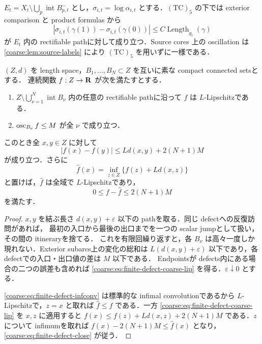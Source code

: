 \documentclass[a4paper,11pt]{ltjsarticle}
\numberwithin{equation}{section}
\theoremstyle{plain}
\theoremstyle{definition}
\theoremstyle{remark}
\newcommand{\Length}{\operatorname{Length}}\newcommand{\Lip}{\operatorname{Lip}}\newcommand{\GH}{\mathrm{GH}}\newcommand{\id}{\mathrm{id}}
\begin{document}
$E_t=X_t\setminus\bigcup_p\operatorname{int}B_{p,t}^-$ とし，$\sigma_{i,t}=\log\alpha_{i,t}$ とする．$\mathrm{(TC)}_5$ の下では exterior comparison と product formulas から
\begin{equation}\label{coarse:eq:exterior-depth-lip}
 |\sigma_{i,t}(\gamma(1))-\sigma_{i,t}(\gamma(0))|
 \le C\Length_{g_t}(\gamma)
\end{equation}
が $E_t$ 内の rectifiable pathに対して成り立つ．Source cores 上の oscillation は \cref{coarse:lem:source-labels} により $\mathrm{(TC)}_5$ を用いずに一様である．

\begin{lemma}\label{coarse:lem:finite-defect-extension}
$(Z,d)$ を length space，$B_1,\ldots,B_N\subset Z$ を互いに素な compact connected setsとする．
連続関数 $f:Z\to\mathbf R$ が次を満たすとする．
\begin{enumerate}[label=\textup{(D\arabic*)}]
\item $Z\setminus\bigcup_{\nu=1}^N\operatorname{int}B_\nu$ 内の任意の rectifiable pathに沿って $f$ は $L$-Lipschitzである．
\item $\operatorname{osc}_{B_\nu}f\le M$ が全 $\nu$ で成り立つ．
\end{enumerate}
このとき全 $x,y\in Z$ に対して
\begin{equation}\label{coarse:eq:finite-defect-coarse-lip}
 |f(x)-f(y)|\le Ld(x,y)+2(N+1)M
\end{equation}
が成り立つ．さらに
\begin{equation}\label{coarse:eq:finite-defect-infconv}
 \widehat f(x)=\inf_{z\in Z}\{f(z)+Ld(x,z)\}
\end{equation}
と置けば，$\widehat f$ は全域で $L$-Lipschitzであり，
\begin{equation}\label{coarse:eq:finite-defect-close}
 0\le f-\widehat f\le2(N+1)M
\end{equation}
を満たす．
\end{lemma}

\begin{proof}
$x,y$ を結ぶ長さ $d(x,y)+\varepsilon$ 以下の pathを取る．同じ defectへの反復訪問があれば，
最初の入口から最後の出口までを一つの scalar jumpとして扱い，その間の itineraryを捨てる．
これを有限回繰り返すと，各 $B_\nu$ は高々一度しか現れない．Exterior subarcs上の変化の総和は
$L(d(x,y)+\varepsilon)$ 以下であり，各 defectでの入口・出口値の差は $M$ 以下である．
Endpointsが defects内にある場合の二つの誤差も含めれば
\eqref{coarse:eq:finite-defect-coarse-lip} を得る．$\varepsilon\downarrow0$ とする．

\eqref{coarse:eq:finite-defect-infconv} は標準的な infimal convolutionであるから $L$-Lipschitzで，$z=x$ と取れば
$\widehat f\le f$ である．一方 \eqref{coarse:eq:finite-defect-coarse-lip} を $x,z$ に適用すると
$f(x)\le f(z)+Ld(x,z)+2(N+1)M$ である．$z$ について infimumを取れば
$f(x)-2(N+1)M\le\widehat f(x)$ となり，\eqref{coarse:eq:finite-defect-close} が従う．
\end{proof}
\end{document}
